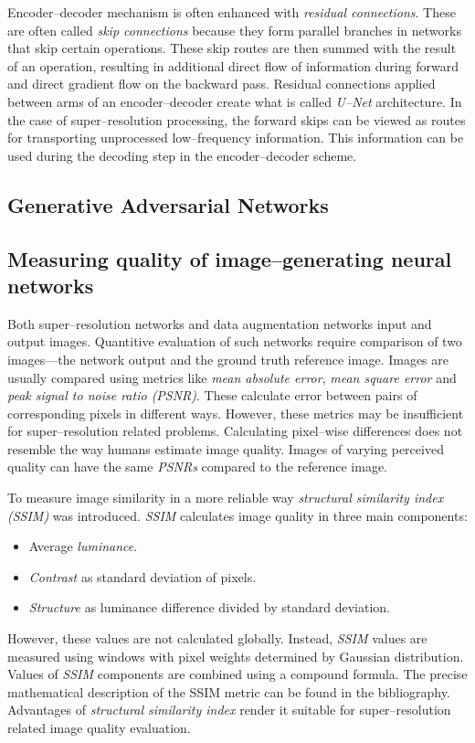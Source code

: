 Encoder--decoder mechanism is often enhanced with \textit{residual connections}.
These are often called \textit{skip connections} because they form parallel branches in networks that skip certain operations.
These skip routes are then summed with the result of an operation, resulting in additional direct flow of information during forward and direct gradient flow on the backward pass.
Residual connections applied between arms of an encoder--decoder create what is called \textit{U--Net} architecture.
In the case of super--resolution processing, the forward skips can be viewed as routes for transporting unprocessed low--frequency information.
This information can be used during the decoding step in the encoder--decoder scheme.

\subsection{Generative Adversarial Networks}

\subsection{Measuring quality of image--generating neural networks}

Both super--resolution networks and data augmentation networks input and output images.
Quantitive evaluation of such networks require comparison of two images---the network output and the ground truth reference image.
Images are usually compared using metrics like \textit{mean absolute error}, \textit{mean square error} and \textit{peak signal to noise ratio (PSNR)}.
These calculate error between pairs of corresponding pixels in different ways.
However, these metrics may be insufficient for super--resolution related problems.
Calculating pixel--wise differences does not resemble the way humans estimate image quality.
Images of varying perceived quality can have the same \textit{PSNRs} compared to the reference image.

To measure image similarity in a more reliable way \textit{structural similarity index (SSIM)} \cite{wang-2004-ssim} was introduced.
\textit{SSIM} calculates image quality in three main components:
\begin{itemize}
	\item Average \textit{luminance}.
	\item \textit{Contrast} as standard deviation of pixels.
	\item \textit{Structure} as luminance difference divided by standard deviation.
\end{itemize}
However, these values are not calculated globally.
Instead, \textit{SSIM} values are measured using windows with pixel weights determined by Gaussian distribution.
Values of \textit{SSIM} components are combined using a compound formula.
The precise mathematical description of the SSIM metric can be found in the bibliography.
Advantages of \textit{structural similarity index} render it suitable for super--resolution related image quality evaluation.

